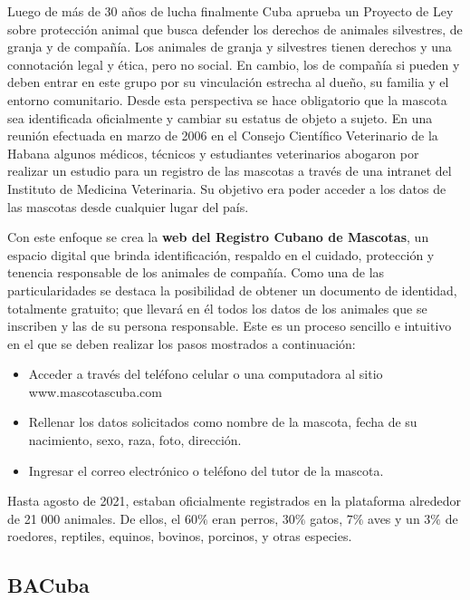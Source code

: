 Luego de más de 30 años de lucha finalmente Cuba aprueba un Proyecto de Ley sobre protección animal que busca defender los derechos de animales silvestres, de granja y de compañía. Los animales de granja y silvestres tienen derechos y una connotación legal y ética, pero no social. En cambio, los de compañía si pueden y deben entrar en este grupo por su vinculación estrecha al dueño, su familia y el entorno comunitario. Desde esta perspectiva se hace obligatorio que la mascota sea identificada oficialmente y cambiar su estatus de objeto a sujeto. En una reunión efectuada en marzo de 2006 en el Consejo Científico Veterinario de la Habana algunos médicos, técnicos y estudiantes veterinarios abogaron por realizar un estudio para un registro de las mascotas a través de una intranet del Instituto de Medicina Veterinaria. Su objetivo era poder acceder a los datos de las mascotas desde cualquier lugar del país.

Con este enfoque se crea la \textbf{web del Registro Cubano de Mascotas}, un espacio digital que brinda identificación, respaldo en el cuidado, protección y tenencia responsable de los animales de compañía. Como una de las particularidades se destaca la posibilidad de obtener un documento de identidad, totalmente gratuito; que llevará en él todos los datos de los animales que se inscriben y las de su persona responsable. Este es un proceso sencillo e intuitivo en el que se deben realizar los pasos mostrados a continuación:

\begin{itemize}
\item Acceder a través del teléfono celular o una computadora al sitio www.mascotascuba.com
\item Rellenar los datos solicitados como nombre de la mascota, fecha de su nacimiento, sexo, raza, foto, dirección.
\item Ingresar el correo electrónico o teléfono del tutor de la mascota.
\end{itemize}

Hasta agosto de 2021, estaban oficialmente registrados en la plataforma alrededor de 21 000 animales. De ellos, el $60 \%$ eran perros, $30 \%$ gatos, $7 \%$ aves y un $3 \%$ de roedores, reptiles, equinos, bovinos, porcinos, y otras especies.

\subsection{BACuba}\label{chapter:introduction}

